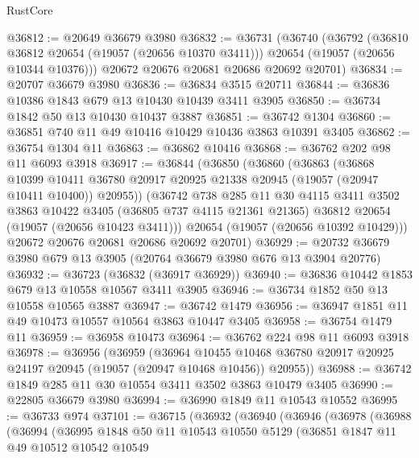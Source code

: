 \begin{lexlean}{RustCore}
\begin{coremodule}
@36812 := @20649 @36679 @3980
@36832 := @36731
    (@36740
      (@36792
        (@36810 @36812 @20654 (@19057 (@20656 @10370 @3411)))
        @20654
        (@19057 (@20656 @10344 @10376)))
      @20672
      @20676
      @20681
      @20686
      @20692
      @20701)
@36834 := @20707 @36679 @3980
@36836 := @36834 @3515 @20711
@36844 := @36836 @10386 @1843 @679 @13 @10430 @10439 @3411 @3905
@36850 := @36734 @1842 @50 @13 @10430 @10437 @3887
@36851 := @36742 @1304
@36860 := @36851 @740 @11 @49 @10416 @10429 @10436 @3863 @10391 @3405
@36862 := @36754 @1304 @11
@36863 := @36862 @10416
@36868 := @36762 @202 @98 @11 @6093 @3918
@36917 := @36844
    (@36850
      (@36860
        (@36863
          (@36868
            @10399
            @10411
            @36780
            @20917
            @20925
            @21338
            @20945
            (@19057 (@20947 @10411 @10400))
            @20955))
        (@36742
          @738
          @285
          @11
          @30
          @4115
          @3411
          @3502
          @3863
          @10422
          @3405
          (@36805 @737 @4115 @21361 @21365)
          @36812
          @20654
          (@19057 (@20656 @10423 @3411)))
        @20654
        (@19057 (@20656 @10392 @10429)))
      @20672
      @20676
      @20681
      @20686
      @20692
      @20701)
@36929 := @20732 @36679 @3980 @679 @13 @3905 (@20764 @36679 @3980 @676 @13 @3904 @20776)
@36932 := @36723 (@36832 (@36917 @36929))
@36940 := @36836 @10442 @1853 @679 @13 @10558 @10567 @3411 @3905
@36946 := @36734 @1852 @50 @13 @10558 @10565 @3887
@36947 := @36742 @1479
@36956 := @36947 @1851 @11 @49 @10473 @10557 @10564 @3863 @10447 @3405
@36958 := @36754 @1479 @11
@36959 := @36958 @10473
@36964 := @36762 @224 @98 @11 @6093 @3918
@36978 := @36956
    (@36959
      (@36964
        @10455
        @10468
        @36780
        @20917
        @20925
        @24197
        @20945
        (@19057 (@20947 @10468 @10456))
        @20955))
@36988 := @36742 @1849 @285 @11 @30 @10554 @3411 @3502 @3863 @10479 @3405
@36990 := @22805 @36679 @3980
@36994 := @36990 @1849 @11 @10543 @10552
@36995 := @36733 @974
@37101 := @36715
    (@36932
      (@36940
        (@36946
          (@36978
            (@36988
              (@36994
                (@36995
                  @1848
                  @50
                  @11
                  @10543
                  @10550
                  @5129
                  (@36851
                    @1847
                    @11
                    @49
                    @10512
                    @10542
                    @10549

\end{coremodule}
\end{lexlean}
